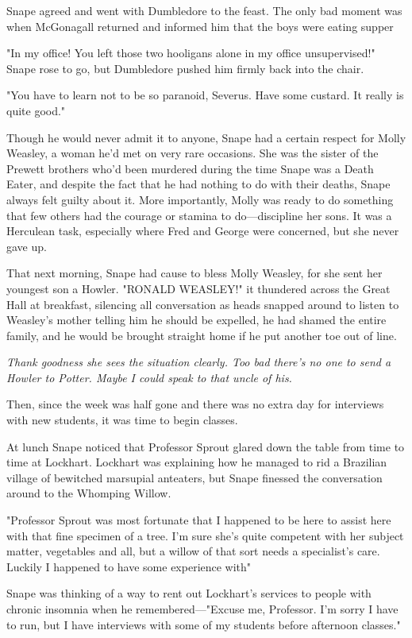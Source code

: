 Snape agreed and went with Dumbledore to the feast. The only bad moment was when McGonagall returned and informed him that the boys were eating supper{\el}

"In my office! You left those two hooligans alone in my office unsupervised!" Snape rose to go, but Dumbledore pushed him firmly back into the chair.

"You have to learn not to be so paranoid, Severus. Have some custard. It really is quite good."

\sbreak

Though he would never admit it to anyone, Snape had a certain respect for Molly Weasley, a woman he'd met on very rare occasions. She was the sister of the Prewett brothers who'd been murdered during the time Snape was a Death Eater, and despite the fact that he had nothing to do with their deaths, Snape always felt guilty about it. More importantly, Molly was ready to do something that few others had the courage or stamina to do—discipline her sons. It was a Herculean task, especially where Fred and George were concerned, but she never gave up.

That next morning, Snape had cause to bless Molly Weasley, for she sent her youngest son a Howler. "RONALD WEASLEY!" it thundered across the Great Hall at breakfast, silencing all conversation as heads snapped around to listen to Weasley's mother telling him he should be expelled, he had shamed the entire family, and he would be brought straight home if he put another toe out of line.

\emph{Thank goodness she sees the situation clearly. Too bad there's no one to send a Howler to Potter. Maybe I could speak to that uncle of his.}

Then, since the week was half gone and there was no extra day for interviews with new students, it was time to begin classes.

At lunch Snape noticed that Professor Sprout glared down the table from time to time at Lockhart. Lockhart was explaining how he managed to rid a Brazilian village of bewitched marsupial anteaters, but Snape finessed the conversation around to the Whomping Willow.

"Professor Sprout was most fortunate that I happened to be here to assist here with that fine specimen of a tree. I'm sure she's quite competent with her subject matter, vegetables and all, but a willow of that sort needs a specialist's care. Luckily I happened to have some experience with{\el}"

Snape was thinking of a way to rent out Lockhart's services to people with chronic insomnia when he remembered—"Excuse me, Professor. I'm sorry I have to run, but I have interviews with some of my students before afternoon classes."

